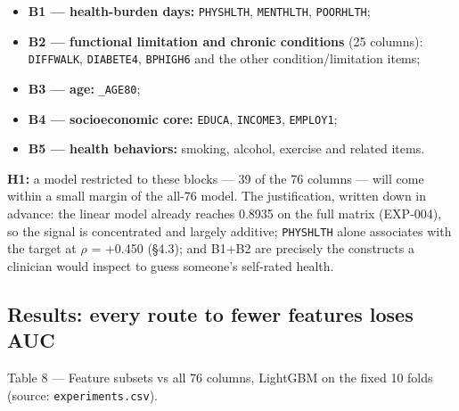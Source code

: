 \documentclass[11pt,a4paper]{article}
\providecommand{\tightlist}{\setlength{\itemsep}{2pt}\setlength{\parskip}{0pt}}
\begin{document}
{\begin{itemize}
\tightlist
\item
  \textbf{B1 --- health-burden days:} \texttt{PHYSHLTH}, \texttt{MENTHLTH}, \texttt{POORHLTH};
\item
  \textbf{B2 --- functional limitation and chronic conditions} (25 columns): \texttt{DIFFWALK}, \texttt{DIABETE4}, \texttt{BPHIGH6} and the other condition/limitation items;
\item
  \textbf{B3 --- age:} \texttt{\_AGE80};
\item
  \textbf{B4 --- socioeconomic core:} \texttt{EDUCA}, \texttt{INCOME3}, \texttt{EMPLOY1};
\item
  \textbf{B5 --- health behaviors:} smoking, alcohol, exercise and related items.
\end{itemize}

\textbf{H1:} a model restricted to these blocks --- 39 of the 76 columns --- will come within a small margin of the all-76 model. The justification, written down in advance: the linear model already reaches 0.8935 on the full matrix (EXP-004), so the signal is concentrated and largely additive; \texttt{PHYSHLTH} alone associates with the target at $\rho$ = +0.450 (\S{}4.3); and B1+B2 are precisely the constructs a clinician would inspect to guess someone's self-rated health.

\subsection{Results: every route to fewer features loses AUC}\label{results-every-route-to-fewer-features-loses-auc}

Table 8 --- Feature subsets vs all 76 columns, LightGBM on the fixed 10 folds (source: \texttt{experiments.csv}).

{\def\LTcaptype{none} %

}}
\end{document}
